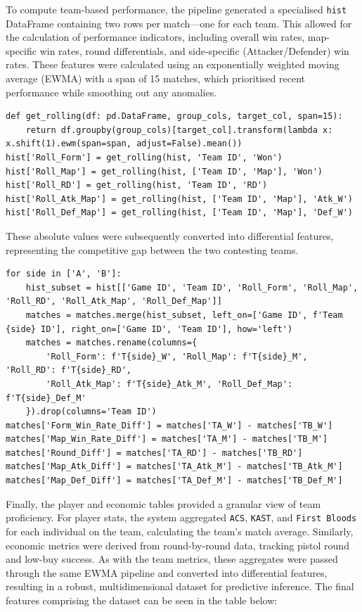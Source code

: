 To compute team-based performance, the pipeline generated a specialised \texttt{hist} DataFrame containing two rows per match---one for each team. This allowed for the calculation of performance indicators, including overall win rates, map-specific win rates, round differentials, and side-specific (Attacker/Defender) win rates. These features were calculated using an exponentially weighted moving average (EWMA) with a span of 15 matches, which prioritised recent performance while smoothing out any anomalies.
\begin{lstlisting}[style=code, caption={Calculating the rolling average for each team}]
def get_rolling(df: pd.DataFrame, group_cols, target_col, span=15):
    return df.groupby(group_cols)[target_col].transform(lambda x: x.shift(1).ewm(span=span, adjust=False).mean())
hist['Roll_Form'] = get_rolling(hist, 'Team ID', 'Won')
hist['Roll_Map'] = get_rolling(hist, ['Team ID', 'Map'], 'Won')
hist['Roll_RD'] = get_rolling(hist, 'Team ID', 'RD')
hist['Roll_Atk_Map'] = get_rolling(hist, ['Team ID', 'Map'], 'Atk_W')
hist['Roll_Def_Map'] = get_rolling(hist, ['Team ID', 'Map'], 'Def_W')
\end{lstlisting}

These absolute values were subsequently converted into differential features, representing the competitive gap between the two contesting teams.

\begin{lstlisting}[style=code, caption={Convert team specific features into differential features}]
for side in ['A', 'B']:
    hist_subset = hist[['Game ID', 'Team ID', 'Roll_Form', 'Roll_Map', 'Roll_RD', 'Roll_Atk_Map', 'Roll_Def_Map']]
    matches = matches.merge(hist_subset, left_on=['Game ID', f'Team {side} ID'], right_on=['Game ID', 'Team ID'], how='left')
    matches = matches.rename(columns={
        'Roll_Form': f'T{side}_W', 'Roll_Map': f'T{side}_M', 'Roll_RD': f'T{side}_RD',
        'Roll_Atk_Map': f'T{side}_Atk_M', 'Roll_Def_Map': f'T{side}_Def_M'
    }).drop(columns='Team ID')
matches['Form_Win_Rate_Diff'] = matches['TA_W'] - matches['TB_W']
matches['Map_Win_Rate_Diff'] = matches['TA_M'] - matches['TB_M']
matches['Round_Diff'] = matches['TA_RD'] - matches['TB_RD']
matches['Map_Atk_Diff'] = matches['TA_Atk_M'] - matches['TB_Atk_M']
matches['Map_Def_Diff'] = matches['TA_Def_M'] - matches['TB_Def_M']
\end{lstlisting}

Finally, the player and economic tables provided a granular view of team proficiency. For player stats, the system aggregated \texttt{ACS}, \texttt{KAST}, and \texttt{First Bloods} for each individual on the team, calculating the team's match average. Similarly, economic metrics were derived from round-by-round data, tracking pistol round and low-buy success. As with the team metrics, these aggregates were passed through the same EWMA pipeline and converted into differential features, resulting in a robust, multidimensional dataset for predictive inference. The final features comprising the dataset can be seen in the table below:

